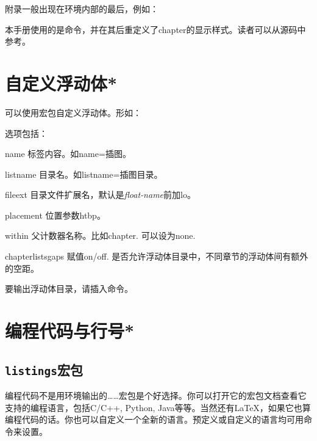 附录一般出现在环境内部的最后，例如：
\begin{latex}
\end{latex}

本手册使用的是命令，并在其后重定义了chapter的显示样式。读者可以从源码中参考。

\section{自定义浮动体*}
可以使用宏包自定义浮动体。形如：
\begin{latex}
\end{latex}

选项包括：
\begin{para}
\item[name] 标签内容。如name=插图。
\item[listname] 目录名。如listname=插图目录。
\item[fileext] 目录文件扩展名，默认是\textit{float-name}前加lo。
\item[placement] 位置参数htbp。
\item[within] 父计数器名称。比如chapter. 可以设为none.
\item[chapterlistsgaps] 赋值on/off. 是否允许浮动体目录中，不同章节的浮动体间有额外的空距。
\end{para}

要输出浮动体目录，请插入命令。

\section{编程代码与行号*}
\label{sec:coding}
\subsection{\texttt{listings}宏包}
编程代码不是用环境输出的……宏包是个好选择。你可以打开它的宏包文档查看它支持的编程语言，包括C/C++, Python, Java等等。当然还有\LaTeX，如果它也算编程代码的话。你也可以自定义一个全新的语言。预定义或自定义的语言均可用命令来设置。
\begin{latex}
\end{latex}


